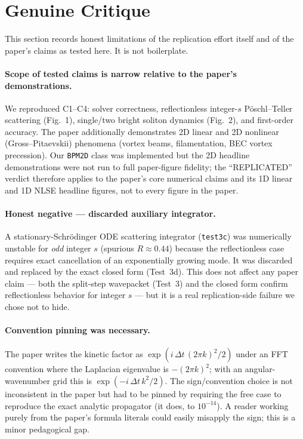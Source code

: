 \documentclass[11pt]{article}
\begin{document}
\section{Genuine Critique}
This section records honest limitations of the replication effort itself and
of the paper's claims as tested here. It is not boilerplate.

\paragraph{Scope of tested claims is narrow relative to the paper's
demonstrations.} We reproduced C1--C4: solver correctness, reflectionless
integer-$s$ P\"oschl--Teller scattering (Fig.~1), single/two bright soliton
dynamics (Fig.~2), and first-order accuracy. The paper additionally
demonstrates 2D linear and 2D nonlinear (Gross--Pitaevskii) phenomena
(vortex beams, filamentation, BEC vortex precession). Our \texttt{BPM2D}
class was implemented but the 2D headline demonstrations were not run to
full paper-figure fidelity; the ``REPLICATED'' verdict therefore applies
to the paper's core numerical claims and its 1D linear and 1D NLSE headline
figures, not to every figure in the paper.

\paragraph{Honest negative --- discarded auxiliary integrator.} A
stationary-Schr\"odinger ODE scattering integrator (\texttt{test3c}) was
numerically unstable for \emph{odd} integer $s$ (spurious $R\approx 0.44$)
because the reflectionless case requires exact cancellation of an
exponentially growing mode. It was discarded and replaced by the exact
closed form (Test~3d). This does not affect any paper claim --- both the
split-step wavepacket (Test~3) and the closed form confirm reflectionless
behavior for integer $s$ --- but it is a real replication-side failure
we chose not to hide.

\paragraph{Convention pinning was necessary.} The paper writes the kinetic
factor as $\exp(i\,\Delta t\,(2\pi k)^2/2)$ under an FFT convention where
the Laplacian eigenvalue is $-(2\pi k)^2$; with an angular-wavenumber grid
this is $\exp(-i\,\Delta t\,k^2/2)$. The sign/convention choice is not
inconsistent in the paper but had to be pinned by requiring the free case
to reproduce the exact analytic propagator (it does, to $10^{-14}$). A
reader working purely from the paper's formula literals could easily
misapply the sign; this is a minor pedagogical gap.
\end{document}
